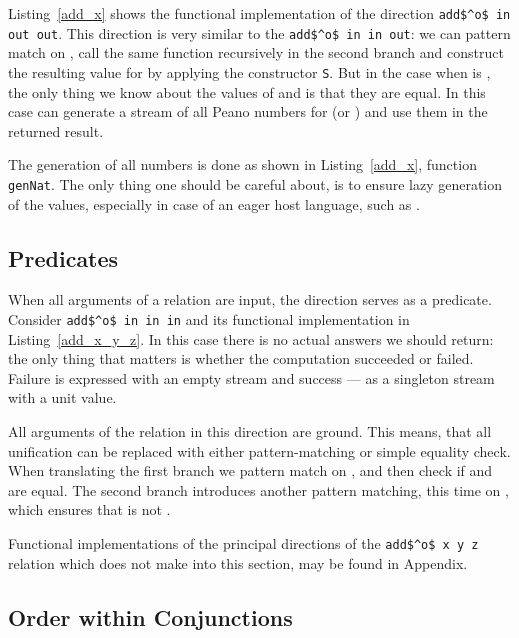 Listing~\ref{add_x} shows the functional implementation of the direction \lstinline{add$^o$ in out out}.
This direction is very similar to the \lstinline{add$^o$ in in out}: we can pattern match on \x, call the same function recursively in the second \conde branch and construct the resulting value for \z by applying the constructor \lstinline{S}.
But in the case when \x is \zero, the only thing we know about the values of \y and \z is that they are equal.
In this case can generate a stream of all Peano numbers for \z (or \y) and use them in the returned result.

The generation of all numbers is done as shown in Listing~\ref{add_x}, function \lstinline{genNat}.
The only thing one should be careful about, is to ensure lazy generation of the values, especially in case of an eager host language, such as \ocaml.



\subsection{Predicates}



When all arguments of a relation are input, the direction serves as a predicate.
Consider \lstinline{add$^o$ in in in} and its functional implementation in Listing~\ref{add_x_y_z}.
In this case there is no actual answers we should return: the only thing that matters is whether the computation succeeded or failed.
Failure is expressed with an empty stream and success --- as a singleton stream with a unit value.

All arguments of the relation in this direction are ground.
This means, that all unification can be replaced with either pattern-matching or simple equality check.
When translating the first \conde branch we pattern match on \x, and then check if \y and \z are equal.
The second \conde branch introduces another pattern matching, this time on \z, which ensures that \z is not \zero.



Functional implementations of the principal directions of the \lstinline{add$^o$ x y z} relation which does not make into this section, may be found in Appendix.

\subsection{Order within Conjunctions}

